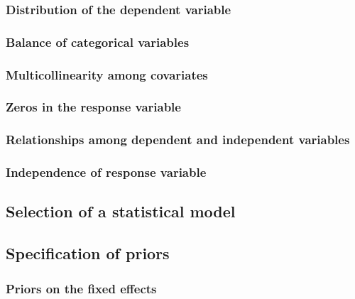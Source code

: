 \documentclass[
]{book}
\begin{document}
\hypertarget{gamma-dist}{%
\subsubsection{Distribution of the dependent
variable}\label{gamma-dist}}

\hypertarget{gamma-balance}{%
\subsubsection{Balance of categorical variables}\label{gamma-balance}}

\hypertarget{gamma-collin}{%
\subsubsection{Multicollinearity among covariates}\label{gamma-collin}}

\hypertarget{gamma-zeros}{%
\subsubsection{Zeros in the response variable}\label{gamma-zeros}}

\hypertarget{gamma-rels}{%
\subsubsection{Relationships among dependent and independent
variables}\label{gamma-rels}}

\hypertarget{gamma-indep}{%
\subsubsection{Independence of response variable}\label{gamma-indep}}

\hypertarget{gamma-select}{%
\subsection{Selection of a statistical model}\label{gamma-select}}

\hypertarget{gamma-prior-spec}{%
\subsection{Specification of priors}\label{gamma-prior-spec}}

\hypertarget{gamma-priors-fixed}{%
\subsubsection{Priors on the fixed effects}\label{gamma-priors-fixed}}
\end{document}
